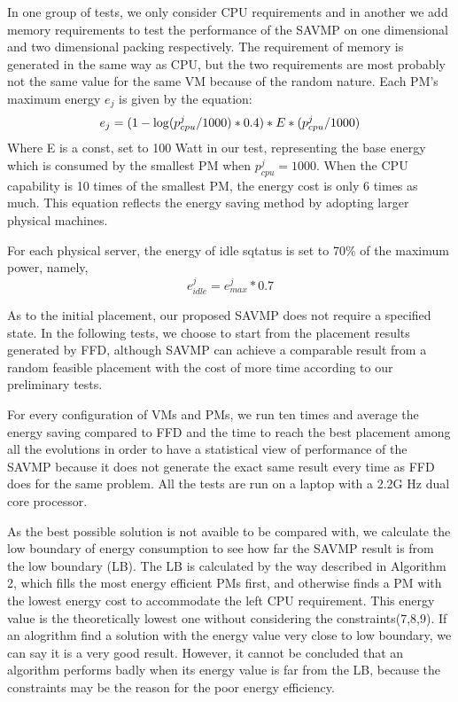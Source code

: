 \documentclass[10pt, conference, compsocconf]{IEEEtran}
\begin{document}
In one group of tests, we only consider CPU requirements and in another we add
memory requirements to test the performance of the SAVMP on one dimensional and
two dimensional packing respectively. The requirement of memory is generated in
the same way as CPU, but the two requirements are most probably not the same
value for the same VM because of the random nature.
Each PM's maximum energy $e_j$ is given by the equation:\\
\begin{equation}\label{13}
e_j=(1-\log (p_{cpu}^j/1000)*0.4)*E*(p_{cpu}^j/1000) \\
\end{equation} 
Where E is a const, set to 100 Watt in our test, representing the base energy
which is consumed by the smallest PM when $p_{cpu}^j=1000$. When the CPU
capability is 10 times of the smallest PM, the energy cost is only 6 times as
much. This equation reflects the energy saving method by adopting larger
physical machines.

For each physical server, the energy of idle sqtatus is set to 70\% of the
 maximum power, namely,\\
 \begin{equation}\label{14}
e_{idle}^j= e_{max}^j*0.7
\end{equation} 

As to the initial placement, our proposed SAVMP does not require a specified
state. In the following tests, we choose to start from the placement results
generated by FFD, although SAVMP can achieve a comparable result from a random
feasible placement with the cost of more time according to our preliminary
tests.

For every configuration of VMs and PMs, we run ten times and average the energy
saving compared to FFD and the time to reach the best placement among all the
evolutions in order to have a statistical view of performance of the SAVMP
because it does not generate the exact same result every time as FFD does for
the same problem. All the tests are run on a laptop with a 2.2G Hz dual core
processor.

As the best possible solution is not avaible to be compared with, we calculate
the low boundary of energy consumption to see how far the SAVMP result is from
the low boundary (LB). The LB is calculated by the way described in Algorithm 2,
which fills the most energy efficient PMs first, and otherwise finds a PM with
the lowest energy cost to accommodate the left CPU requirement. This energy
value is the theoretically lowest one without considering the
constraints(7,8,9). If an alogrithm find a solution with the energy value very
close to low boundary, we can say it is a very good result. However, it cannot
be concluded that an algorithm performs badly when its energy value is far from
the LB, because the constraints may be the reason for the poor energy
efficiency.
\end{document}
